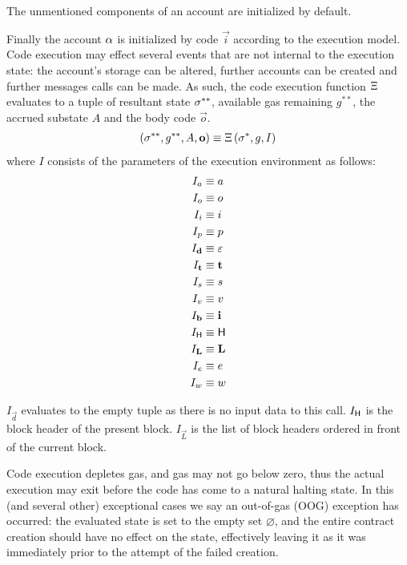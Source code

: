 The unmentioned components of an account are initialized by default.

Finally the account $\mathbf{\alpha}$ is initialized by \cvm code $\vec{i}$ according to the execution model.
Code execution may effect several events that are not internal to the execution state:
the account's storage can be altered, further accounts can be created and further messages calls can be made.
As such, the code execution function $\mathrm{\Xi}$ evaluates to a tuple of resultant state $\mathbf{\sigma}^{**}$, available gas remaining $g^{**}$, the accrued substate $A$ and the body code $\vec{o}$.
\begin{align}
	\left(\mathbf{\sigma}^{**}, g^{**},  A, \mathbf{o} \right) \equiv \mathrm{\Xi}\left(\mathbf{\sigma}^*, g, I\right)
\end{align}
where $I$ consists of the parameters of the execution environment as follows:
\begin{align}
	I_a &\equiv a\\
	I_o &\equiv o\\
	I_i &\equiv i\\
	I_p &\equiv p\\
	I_{\mathbf{d}} &\equiv \mathbb{\varepsilon}\\
	I_{\mathbf{t}} & \equiv \mathbf{t}\\
	I_s &\equiv s\\
	I_v &\equiv v\\
	I_{\mathbf{b}} &\equiv \mathbf{i}\\
	I_{\textsf{H}} & \equiv \textsf{H} \\
	I_{\mathbf{L}} & \equiv \mathbf{L} \\ 
	I_e &\equiv e\\
	I_w &\equiv w
\end{align}

$I_{\vec{d}}$ evaluates to the empty tuple as there is no input data to this call. 
$I_{\textsf{H}}$ is the block header of the present block.
$I_\vec{L}$ is the list of block headers ordered in front of the current block.

Code execution depletes gas, and gas may not go below zero, thus the actual execution may exit before the code has come to a natural halting state.
In this (and several other) exceptional cases we say an out-of-gas (OOG) exception has occurred:
the evaluated state is set to the empty set $\varnothing$, 
and the entire contract creation should have no effect on the state, effectively leaving it as it was immediately prior to the attempt of the failed creation.


